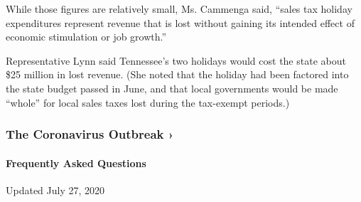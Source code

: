 While those figures are relatively small, Ms. Cammenga said, ``sales tax
holiday expenditures represent revenue that is lost without gaining its
intended effect of economic stimulation or job growth.''

Representative Lynn said Tennessee's two holidays would cost the state
about \$25 million in lost revenue. (She noted that the holiday had been
factored into the state budget passed in June, and that local
governments would be made ``whole'' for local sales taxes lost during
the tax-exempt periods.)

\href{https://www.nytimes.com/news-event/coronavirus?action=click\&pgtype=Article\&state=default\&region=MAIN_CONTENT_3\&context=storylines_faq}{}

\hypertarget{the-coronavirus-outbreak-}{%
\subsubsection{The Coronavirus Outbreak
›}\label{the-coronavirus-outbreak-}}

\hypertarget{frequently-asked-questions}{%
\paragraph{Frequently Asked
Questions}\label{frequently-asked-questions}}

Updated July 27, 2020

